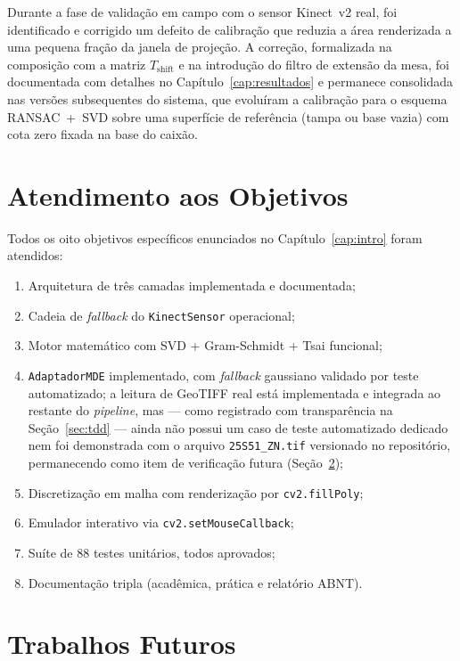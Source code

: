 Durante a fase de validação em campo com o sensor Kinect~v2 real, foi
identificado e corrigido um defeito de calibração que reduzia a área
renderizada a uma pequena fração da janela de projeção. A correção,
formalizada na composição com a matriz $T_{\text{shift}}$ e na
introdução do filtro de extensão da mesa, foi documentada com
detalhes no Capítulo~\ref{cap:resultados} e permanece consolidada nas
versões subsequentes do sistema, que evoluíram a calibração para o
esquema RANSAC~+~SVD sobre uma superfície de referência (tampa ou
base vazia) com cota zero fixada na base do caixão.

\section{Atendimento aos Objetivos}

Todos os oito objetivos específicos enunciados no
Capítulo~\ref{cap:intro} foram atendidos:

\begin{enumerate}
    \item Arquitetura de três camadas implementada e documentada;
    \item Cadeia de \textit{fallback} do \texttt{KinectSensor} operacional;
    \item Motor matemático com SVD + Gram-Schmidt + Tsai funcional;
    \item \texttt{AdaptadorMDE} implementado, com \emph{fallback} gaussiano
          validado por teste automatizado; a leitura de GeoTIFF real está
          implementada e integrada ao restante do \textit{pipeline}, mas
          — como registrado com transparência na
          Seção~\ref{sec:tdd} — ainda não possui um caso de teste
          automatizado dedicado nem foi demonstrada com o arquivo
          \texttt{25S51\_ZN.tif} versionado no repositório, permanecendo
          como item de verificação futura (Seção~\ref{sec:trabalhos-futuros});
    \item Discretização em malha com renderização por \texttt{cv2.fillPoly};
    \item Emulador interativo via \texttt{cv2.setMouseCallback};
    \item Suíte de 88 testes unitários, todos aprovados;
    \item Documentação tripla (acadêmica, prática e relatório ABNT).
\end{enumerate}

\section{Trabalhos Futuros}
\label{sec:trabalhos-futuros}


